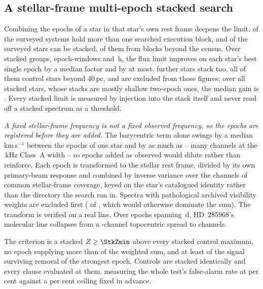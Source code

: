 \subsection{A stellar-frame multi-epoch stacked search}
\label{sec:stack}

Combining the epochs of a star in that star's own rest frame deepens the
limit. \EpMulti{} of the \NSystems{} surveyed systems hold more than one
searched execution block, and \SxStkStarCensus{} of the surveyed stars can be
stacked, \SttNStkOneEb{} of them from blocks beyond the census. Over \SyStkNGroup{} stacked groups, \SyStkNEpochComb{} epoch-windows and
\SyStkHours\,h, the flux limit improves on each star's best single epoch by a
median factor \SyStkGainMed{} and by \SyStkGainMax{} at most.
\SxStkStarOutside{} further stars stack too, all of them control stars beyond
40\,pc, and are excluded from those figures; over all \StkNStar{} stacked
stars, whose stacks are mostly shallow two-epoch ones, the median gain is
\StkLimitGainMed. Every
stacked limit is measured by injection into the stack itself and never read
off a stacked spectrum as a threshold.

\emph{A fixed stellar-frame frequency is not a fixed observed frequency, so
the epochs are registered before they are added.} The barycentric term alone
swings by a median \StkVcorrSwingMed\,km\,s$^{-1}$ between the epochs of one
star and by as much as \StkVcorrSwingMax{} -- many channels at the
\StkRefChanKHz\,kHz Class~A width -- so epochs added as observed would dilute
rather than reinforce. Each epoch is transformed to the stellar rest frame,
divided by its own primary-beam response and combined by inverse variance
over the channels of common stellar-frame coverage, keyed on the star's
catalogued identity rather than the directory the search ran in. Spectra with
pathological archived visibility weights are excluded first
(\StkBadWeight{} of \StkNProd, which would otherwise dominate the sum). The transform is verified on a real line. Over \StkRegNEpoch{} epochs
spanning \StkRegSpanD\,d, HD~285968's molecular line collapses from a
\StkRegTopoChan-channel topocentric spread to \StkRegStellarChan{}
channels.

The criterion is a stacked
$Z\ge\StkZmin$ above every stacked control maximum, no epoch supplying more
than \StkDomMax{} of the weighted sum, and at least \StkJkMin{} of the signal
surviving removal of the strongest epoch. Controls are stacked identically
and every clause evaluated at them, measuring the whole test's
false-alarm rate at \StkCtrlFap{} per cent against a \StkFapCeil{} per cent
ceiling fixed in advance.

